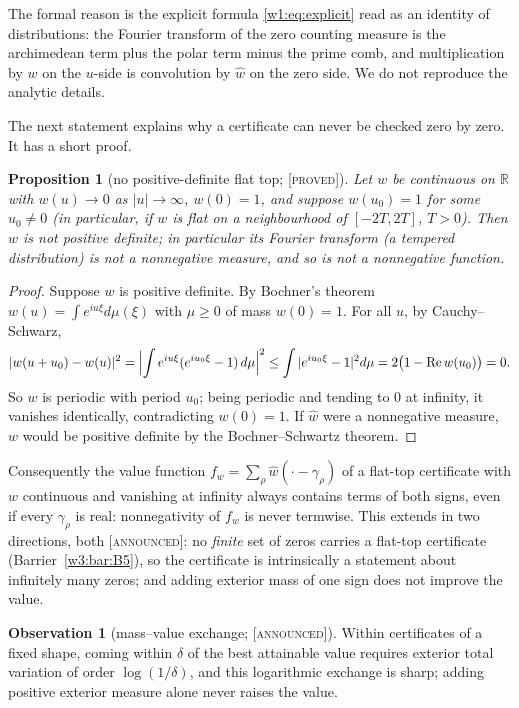 \documentclass[11pt]{amsart}
\newtheorem{proposition}[theorem]{Proposition}
\theoremstyle{definition}
\newtheorem{observation}[theorem]{Observation}
\theoremstyle{remark}
\numberwithin{equation}{section}
\newcommand{\R}{\mathbb{R}}
\DeclareMathOperator{\Rel}{Re}
\newcommand{\stag}[1]{\textsc{[#1]}}
\newcommand{\PROVED}{\stag{proved}}
\newcommand{\ANNOUNCED}{\stag{announced}}
\begin{document}
The formal reason is the explicit formula \eqref{w1:eq:explicit} read as an identity of distributions: the Fourier
transform of the zero counting measure is the archimedean term plus the polar term minus the prime comb, and
multiplication by $w$ on the $u$-side is convolution by $\widehat w$ on the zero side. We do not reproduce the
analytic details.

The next statement explains why a certificate can never be checked zero by zero. It has a short proof.

\begin{proposition}[no positive-definite flat top; \PROVED]\label{w5:prop:noPD}
Let $w$ be continuous on $\R$ with $w(u)\to0$ as $|u|\to\infty$, $w(0)=1$, and suppose $w(u_0)=1$ for some $u_0\ne0$
(in particular, if $w$ is flat on a neighbourhood of $[-2T,2T]$, $T>0$). Then $w$ is not positive definite; in particular its
Fourier transform (a tempered distribution) is not a nonnegative measure, and so is not a nonnegative function.
\end{proposition}

\begin{proof}
Suppose $w$ is positive definite. By Bochner's theorem $w(u)=\int e^{iu\xi}d\mu(\xi)$ with $\mu\ge0$ of mass $w(0)=1$.
For all $u$, by Cauchy--Schwarz,
\[
  |w(u+u_0)-w(u)|^2=\Bigl|\int e^{iu\xi}(e^{iu_0\xi}-1)\,d\mu\Bigr|^2\le\int|e^{iu_0\xi}-1|^2d\mu=2\bigl(1-\Rel w(u_0)\bigr)=0 .
\]
So $w$ is periodic with period $u_0$; being periodic and tending to $0$ at infinity, it vanishes identically, contradicting $w(0)=1$. If
$\widehat w$ were a nonnegative measure, $w$ would be positive definite by the Bochner--Schwartz theorem.
\end{proof}

Consequently the value function $f_w=\sum_\rho\widehat w(\cdot-\gamma_\rho)$ of a flat-top certificate with $w$ continuous and vanishing at infinity always contains terms of both signs, even if every $\gamma_\rho$ is real: nonnegativity of $f_w$ is never
termwise. This extends in two directions, both \ANNOUNCED: no \emph{finite} set of zeros carries a flat-top
certificate (Barrier~\ref{w3:bar:B5}), so the certificate is intrinsically a statement about infinitely many zeros; and
adding exterior mass of one sign does not improve the value.

\begin{observation}[mass--value exchange; \ANNOUNCED]\label{w5:obs:massvalue}
Within certificates of a fixed shape, coming within $\delta$ of the best attainable value requires exterior total
variation of order $\log(1/\delta)$, and this logarithmic exchange is sharp; adding positive exterior measure alone never
raises the value.
\end{observation}
\end{document}
